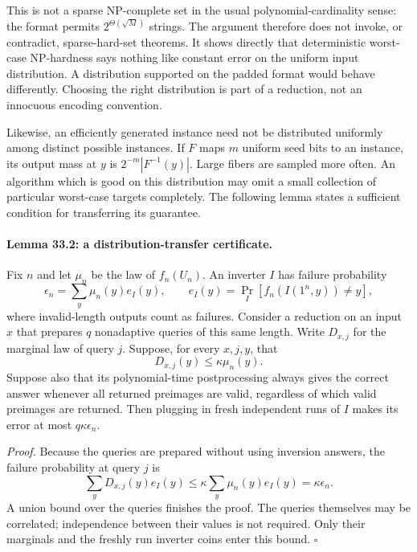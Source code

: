 \documentclass[11pt]{article}
\begin{document}
This is not a sparse NP-complete set in the usual polynomial-cardinality
sense: the format permits $2^{\Theta(\sqrt M)}$ strings. The argument
therefore does not invoke, or contradict, sparse-hard-set theorems. It
shows directly that deterministic worst-case NP-hardness says nothing
like constant error on the uniform input distribution. A distribution
supported on the padded format would behave differently. Choosing the
right distribution is part of a reduction, not an innocuous encoding
convention.

Likewise, an efficiently generated instance need not be distributed
uniformly among distinct possible instances. If $F$ maps $m$ uniform
seed bits to an instance, its output mass at $y$ is
$2^{-m}|F^{-1}(y)|$. Large fibers are sampled more often. An algorithm
which is good on this distribution may omit a small collection of
particular worst-case targets completely. The following lemma states a
sufficient condition for transferring its guarantee.

\paragraph{Lemma 33.2: a distribution-transfer certificate.}
Fix $n$ and let $\mu_n$ be the law of $f_n(U_n)$. An inverter $I$ has
failure probability
\[
 \epsilon_n=\sum_y\mu_n(y)e_I(y),\qquad
 e_I(y)=\Pr_I[f_n(I(1^n,y))\ne y],
\]
where invalid-length outputs count as failures. Consider a reduction on
an input $x$ that prepares $q$ nonadaptive queries of this same length.
Write $D_{x,j}$ for the marginal law of query $j$. Suppose, for every
$x,j,y$, that
\begin{equation}\label{r33:domination}
                    D_{x,j}(y)\le\kappa\mu_n(y).
\end{equation}
Suppose also that its polynomial-time postprocessing always gives the
correct answer whenever all returned preimages are valid, regardless of
which valid preimages are returned. Then plugging in fresh independent
runs of $I$ makes its error at most $q\kappa\epsilon_n$.

\emph{Proof.} Because the queries are prepared without using inversion
answers, the failure probability at query $j$ is
\[
 \sum_yD_{x,j}(y)e_I(y)
 \le\kappa\sum_y\mu_n(y)e_I(y)=\kappa\epsilon_n.
\]
A union bound over the queries finishes the proof. The queries themselves
may be correlated; independence between their values is not required.
Only their marginals and the freshly run inverter coins enter this bound.
\hfill$\square$
\end{document}
